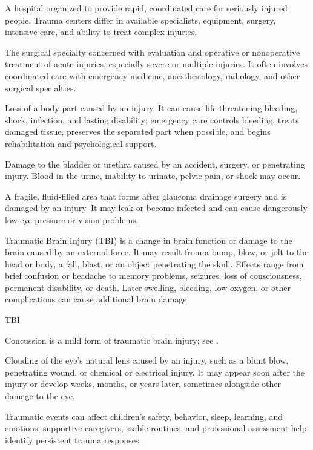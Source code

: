  A hospital organized to provide rapid, coordinated care for seriously injured people. Trauma centers differ in available specialists, equipment, surgery, intensive care, and ability to treat complex injuries.

 The surgical specialty concerned with evaluation and operative or nonoperative treatment of acute injuries, especially severe or multiple injuries. It often involves coordinated care with emergency medicine, anesthesiology, radiology, and other surgical specialties.

 Loss of a body part caused by an injury. It can cause life-threatening bleeding, shock, infection, and lasting disability; emergency care controls bleeding, treats damaged tissue, preserves the separated part when possible, and begins rehabilitation and psychological support.

 Damage to the bladder or urethra caused by an accident, surgery, or penetrating injury. Blood in the urine, inability to urinate, pelvic pain, or shock may occur.

 A fragile, fluid-filled area that forms after glaucoma drainage surgery and is damaged by an injury. It may leak or become infected and can cause dangerously low eye pressure or vision problems.

 Traumatic Brain Injury (TBI) is a change in brain function or damage to the brain caused by an external force. It may result from a bump, blow, or jolt to the head or body, a fall, blast, or an object penetrating the skull. Effects range from brief confusion or headache to memory problems, seizures, loss of consciousness, permanent disability, or death. Later swelling, bleeding, low oxygen, or other complications can cause additional brain damage.

\synonyms
TBI

 Concussion is a mild form of traumatic brain injury; see .

 Clouding of the eye’s natural lens caused by an injury, such as a blunt blow, penetrating wound, or chemical or electrical injury. It may appear soon after the injury or develop weeks, months, or years later, sometimes alongside other damage to the eye.

 Traumatic events can affect children’s safety, behavior, sleep, learning, and emotions; supportive caregivers, stable routines, and professional assessment help identify persistent trauma responses.

